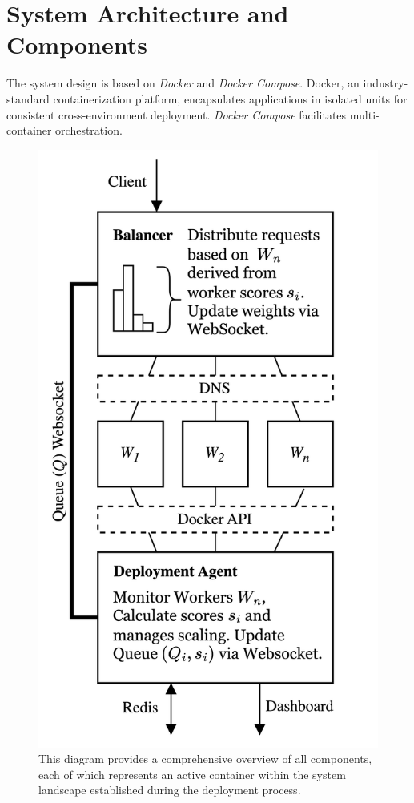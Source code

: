 \documentclass[twocolumn]{webofc}
\begin{document}
\section{System Architecture and Components}
The system design is based on \textit{Docker} and \textit{Docker Compose}. Docker, an industry-standard containerization platform, encapsulates applications in isolated units for consistent cross-environment deployment\cite{docker_overview}. \textit{Docker Compose} facilitates multi-container orchestration\cite{docker_compose}.
\begin{figure}[H]
    \centering
    \includegraphics[width=0.701\columnwidth]{minimaloverview.png}
    \caption{This diagram provides a comprehensive overview of all components, each of which represents an active container within the system landscape established during the deployment process.}
    \label{fig:minimal}
\end{figure}
\end{document}
